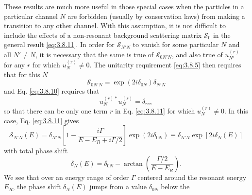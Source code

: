These results are much more useful in those special cases when the particles
in a particular channel $N$ are forbidden (usually by conservation laws) from
making a transition to any other channel. With this assumption, it is not
difficult to include the effects of a non-resonant background scattering
matrix $\mathcal S_0$ in the general result \eqref{eq:3.8.11}. In order for
$\mathcal S_{N'N}$ to vanish for some particular $N$ and all $N'\neq N$, it
is necessary that the same is true of $\mathcal S_{0N'N}$, and also true of
$u_{N'}^{(r)}$ for any $r$ for which $u_N^{(r)}\neq0$. The unitarity
requirement \eqref{eq:3.8.5} then requires that for this $N$
\[
  \mathcal S_{0N'N}=\exp(2i\delta_{0N})\delta_{N'N}
\]
and Eq. \eqref{eq:3.8.10} requires that
\[
  u_N^{(r)*}u_N^{(s)}=\delta_{rs},
\]
so that there can be only one term $r$ in Eq. \eqref{eq:3.8.11} for which
$u_N^{(r)}\neq0$. In this case, Eq. \eqref{eq:3.8.11} gives
\[
  \mathcal S_{N'N}(E)=\delta_{N'N}
   \left[1-\frac{i\Gamma}{E-E_R+i\Gamma/2}\right]
   \exp(2i\delta_{0N})
  \equiv\delta_{N'N}\exp[2i\delta_N(E)]
\]
with total phase shift
\begin{equation}
  \delta_N(E)=\delta_{0N}-\arctan\!\left(\frac{\Gamma/2}{E-E_R}\right).
  \tag{3.8.21}\label{eq:3.8.21}
\end{equation}
We see that over an energy range of order $\Gamma$ centered around the
resonant energy $E_R$, the phase shift $\delta_N(E)$ jumps from a value
$\delta_{0N}$ below the
